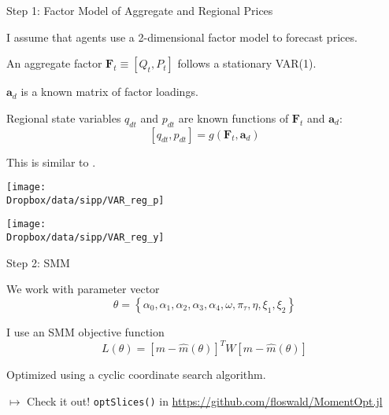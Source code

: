 \documentclass[12pt,english, aspectratio=169]{beamer}
\begin{document}
\begin{frame}{Step 1: Factor Model of Aggregate and Regional Prices }

\begin{midi}
\item I assume that agents use a 2-dimensional factor model to forecast
prices.
\item An aggregate factor $\mathbf{F}_{t}\equiv\left[Q_{t},P_{t}\right]$
follows a stationary VAR(1).
\item $\mathbf{a}_{d}$ is a known matrix of factor loadings.
\item Regional state variables $q_{dt}$ and $p_{dt}$ are known functions
of $\mathbf{F}_{t}$ and $\mathbf{a}_{d}$:
\[
\left[q_{dt},p_{dt}\right]=g\left(\mathbf{F}_{t},\mathbf{a}_{d}\right)
\]
\item This is similar to \cite{krusell_smith}.
\end{midi}

\end{frame}
\begin{frame}[plain]{}

\begin{center}
\texttt{[image: \\Dropbox/data/sipp/VAR\_reg\_p]}
\par\end{center}

\end{frame}

\begin{frame}[plain]{}

\begin{center}
\texttt{[image: \\Dropbox/data/sipp/VAR\_reg\_y]}
\par\end{center}

\end{frame}


% 

\begin{longv}
\begin{frame}{Step 2: SMM}
\begin{midi}
\item We work with parameter vector \[\theta=\left\{ \alpha_{0},\alpha_{1},\alpha_{2},\alpha_{3},\alpha_{4},\omega,\pi_{\tau},\eta,\xi_{1},\xi_{2}\right\} \]
\item I use an SMM objective function
    \[L(\theta)=\left[m-\hat{m}(\theta)\right]^{T}W\left[m-\hat{m}(\theta)\right]\]
\item Optimized using a cyclic coordinate search algorithm.
\item $\mapsto$ Check it out! \texttt{optSlices()} in \url{https://github.com/floswald/MomentOpt.jl}
\end{midi}
\end{frame}
\end{longv}
\end{document}
